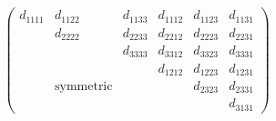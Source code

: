 \[  \left(
\begin{array}{cccccc}
d_{1111} & d_{1122} & d_{1133} & d_{1112} & d_{1123} & d_{1131} \\
         & d_{2222} & d_{2233} & d_{2212} & d_{2223} & d_{2231} \\
         &          & d_{3333} & d_{3312} & d_{3323} & d_{3331} \\
         &          &          & d_{1212} & d_{1223} & d_{1231} \\
         & \mbox{symmetric} & & & d_{2323} & d_{2331} \\
         &          &          &          &          & d_{3131}
\end{array}
\right) \]